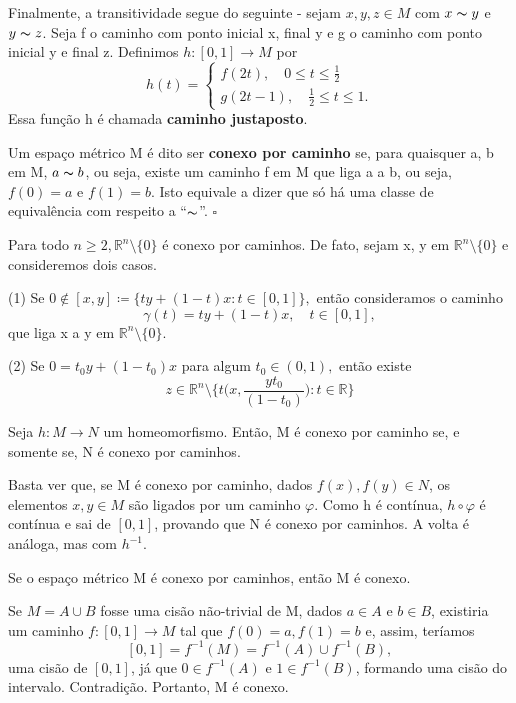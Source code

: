 \documentclass[metric_notes.tex]{subfiles}
\begin{document}
Finalmente, a transitividade segue do seguinte - sejam \(x, y, z\in M\) com \(x\thicksim y\) e \(y\thicksim z\). Seja f o caminho com ponto inicial x, final y e g o
caminho com ponto inicial y e final z. Definimos \(h:[0, 1]\rightarrow M \) por
\[
	h(t) = \left\{\begin{array}{ll}
		f(2t),\quad 0\leq t\leq \frac{1}{2} \\
		g(2t-1),\quad \frac{1}{2}\leq t\leq 1.
	\end{array}\right.
\]
Essa função h é chamada \textbf{caminho justaposto}.
\begin{def*}
	Um espaço métrico M é dito ser \textbf{conexo por caminho} se, para quaisquer a, b em M, \(a\thicksim b\), ou seja,
	existe um caminho f em M que liga a a b, ou seja, \(f(0)=a\) e \(f(1)=b.\) Isto equivale a dizer que só há uma
	classe de equivalência com respeito a ``\(\thicksim\)''. \(\square\)
\end{def*}
\begin{example}
	Para todo \(n\geq 2, \mathbb{R}^{n}\setminus\{0\}\) é conexo por caminhos. De fato, sejam x, y em \(\mathbb{R}^{n}\setminus\{0\}\) e
	consideremos dois casos.

	(1) Se \(0\not\in[x, y]\coloneqq \{ty + (1-t)x: t\in[0, 1]\},\) então consideramos o caminho
	\[
		\gamma (t) = ty + (1-t)x,\quad t\in[0,1],
	\]
	que liga x a y em \(\mathbb{R}^{n}\setminus\{0\}.\)

	(2) Se \(0 = t_{0}y + (1-t_{0})x\) para algum \(t_{0}\in (0, 1),\) então existe
	\[
		z\in \mathbb{R}^{n}\setminus\biggl\{t \biggl(x, \frac{yt_{0}}{(1-t_{0})}\biggr):t\in \mathbb{R}\biggr\}
	\]
\end{example}
\begin{theorem*}
	Seja \(h:M\rightarrow N\) um homeomorfismo. Então, M é conexo por caminho se, e somente se, N é conexo por caminhos.
\end{theorem*}
\begin{proof*}
	Basta ver que, se M é conexo por caminho, dados \(f(x), f(y)\in N\), os elementos \(x, y\in M\) são ligados por um caminho \(\varphi \). Como h
	é contínua, \(h\circ{\varphi }\) é contínua e sai de \([0, 1]\), provando que N é conexo por caminhos. A volta é análoga, mas com \(h^{-1}.\) \qedsymbol
\end{proof*}
\begin{theorem*}
	Se o espaço métrico M é conexo por caminhos, então M é conexo.
\end{theorem*}
\begin{proof*}
	Se \(M = A \cup B\) fosse uma cisão não-trivial de M, dados \(a\in A\) e \(b\in B\), existiria um caminho
	\(f:[0, 1]\rightarrow M\) tal que \(f(0) = a, f(1) = b\) e, assim, teríamos
	\[
		[0, 1] = f^{-1}(M) = f^{-1}(A)\cup f^{-1}(B),
	\]
	uma cisão de \([0, 1]\), já que \(0\in f^{-1}(A)\) e \(1\in f^{-1}(B)\), formando uma cisão do intervalo. Contradição.
	Portanto, M é conexo. \qedsymbol
\end{proof*}
\end{document}
